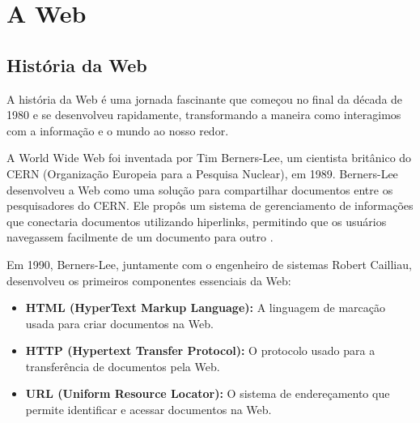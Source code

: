 

\chapter{A Web}

\section{História da Web}

A história da Web é uma jornada fascinante que começou no final da década de 1980 e se desenvolveu rapidamente, transformando a maneira como interagimos com a informação e o mundo ao nosso redor.

A World Wide Web foi inventada por Tim Berners-Lee, um cientista britânico do CERN (Organização Europeia para a Pesquisa Nuclear), em 1989. Berners-Lee desenvolveu a Web como uma solução para compartilhar documentos entre os pesquisadores do CERN. Ele propôs um sistema de gerenciamento de informações que conectaria documentos utilizando hiperlinks, permitindo que os usuários navegassem facilmente de um documento para outro .

Em 1990, Berners-Lee, juntamente com o engenheiro de sistemas Robert Cailliau, desenvolveu os primeiros componentes essenciais da Web:
\begin{itemize}
    \item \textbf{HTML (HyperText Markup Language):} A linguagem de marcação usada para criar documentos na Web.
    \item \textbf{HTTP (Hypertext Transfer Protocol):} O protocolo usado para a transferência de documentos pela Web.
    \item \textbf{URL (Uniform Resource Locator):} O sistema de endereçamento que permite identificar e acessar documentos na Web.
\end{itemize}

